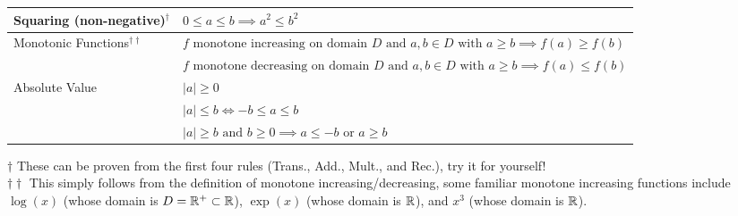 \begin{center}
\begin{tabular}{|p{3.5cm}|p{11.1cm}|}
\hline
Squaring (non-negative)$^\dagger$ &
\( 0 \leq a \leq b \implies a^2 \leq b^2 \) \\
\hline
Monotonic Functions$^{\dagger\dagger}$ &
\( f \text{ monotone increasing on domain } D \text{ and } a,b \in D \text{ with } a \geq b \implies f(a) \geq f(b) \) \\
& \( f \text{ monotone decreasing on domain } D \text{ and } a,b \in D \text{ with } a \geq b \implies f(a) \leq f(b) \) \\
\hline
Absolute Value &
\( |a| \geq 0 \) \\
& \( |a| \leq b \iff -b \leq a \leq b \) \\
& \( |a| \geq b \text{ and } b \geq 0 \implies a \leq -b \text{ or } a \geq b \) \\
\hline
\end{tabular}
\end{center}
\vspace{-0.1in}
$\dagger$ These can be proven from the first four rules (Trans., Add., Mult., and Rec.), try it for yourself! \\
$\dagger\dagger$ This simply follows from the definition of monotone increasing/decreasing, some familiar monotone increasing functions include $\log(x)$ (whose domain is $D={\mathbb{ R}}^+ \subset {\mathbb{ R}}$), $\exp(x)$ (whose domain is ${\mathbb{ R}}$), and $x^3$ (whose domain is ${\mathbb{ R}}$).

\newpage

